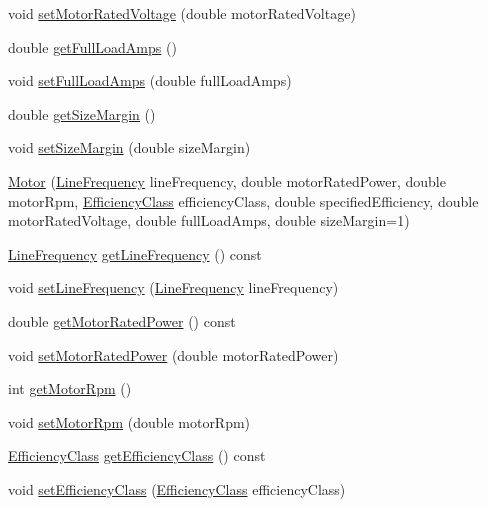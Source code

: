 \begin{DoxyCompactItemize}
\item 
void \hyperlink{class_motor_aab754019236e34cba0acd3632567515e}{set\+Motor\+Rated\+Voltage} (double motor\+Rated\+Voltage)
\item 
double \hyperlink{class_motor_a612eb0dabb9623ee8e0866046527d16a}{get\+Full\+Load\+Amps} ()
\item 
void \hyperlink{class_motor_a4bc8bf85c7749a0b7ff279d7eef20a2e}{set\+Full\+Load\+Amps} (double full\+Load\+Amps)
\item 
double \hyperlink{class_motor_aff485f55bed5b58d1454ce5c71bc0729}{get\+Size\+Margin} ()
\item 
void \hyperlink{class_motor_ab39a9375d17af151b6f9516674f37928}{set\+Size\+Margin} (double size\+Margin)
\item 
\hyperlink{class_motor_a529cb2685eef1f83ae6a775dd5e50ad9}{Motor} (\hyperlink{class_motor_acee1bdf1b684ad36cb80dc2829d9fcee}{Line\+Frequency} line\+Frequency, double motor\+Rated\+Power, double motor\+Rpm, \hyperlink{class_motor_afa022971ae062406a9f588c601673d4e}{Efficiency\+Class} efficiency\+Class, double specified\+Efficiency, double motor\+Rated\+Voltage, double full\+Load\+Amps, double size\+Margin=1)
\item 
\hyperlink{class_motor_acee1bdf1b684ad36cb80dc2829d9fcee}{Line\+Frequency} \hyperlink{class_motor_a41e71462fe60674a5554e47d0079b0f3}{get\+Line\+Frequency} () const
\item 
void \hyperlink{class_motor_a450e5ecea25b05413b731379f153c3f1}{set\+Line\+Frequency} (\hyperlink{class_motor_acee1bdf1b684ad36cb80dc2829d9fcee}{Line\+Frequency} line\+Frequency)
\item 
double \hyperlink{class_motor_a476d3790492959945b3b75d1638f737f}{get\+Motor\+Rated\+Power} () const
\item 
void \hyperlink{class_motor_aa01f82db13c71b045b05e49f42ba46e9}{set\+Motor\+Rated\+Power} (double motor\+Rated\+Power)
\item 
int \hyperlink{class_motor_a13826c93b894d699478e34a98ffb35ab}{get\+Motor\+Rpm} ()
\item 
void \hyperlink{class_motor_ac0fda674bd40e24bb864e8256fb5ba32}{set\+Motor\+Rpm} (double motor\+Rpm)
\item 
\hyperlink{class_motor_afa022971ae062406a9f588c601673d4e}{Efficiency\+Class} \hyperlink{class_motor_a5d0078bdc164e5ed14334373f183be55}{get\+Efficiency\+Class} () const
\item 
void \hyperlink{class_motor_afa82df266d74ccfed49bf592b5b6526f}{set\+Efficiency\+Class} (\hyperlink{class_motor_afa022971ae062406a9f588c601673d4e}{Efficiency\+Class} efficiency\+Class)

\end{DoxyCompactItemize}
